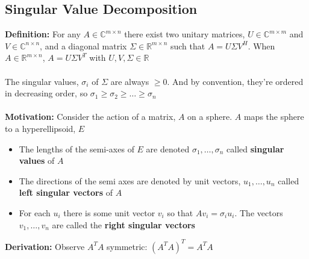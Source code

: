 \documentclass{article}
\begin{document}
\subsection{Singular Value Decomposition}
\textbf{Definition:} For any $A \in \mathbb{C}^{m\times n}$ there exist two unitary matrices, $U \in \mathbb{C}^{m \times m}$ and $V \in \mathbb{C}^{n \times n}$, and a diagonal matrix $\Sigma \in \mathbb{R}^{m \times n}$ such that $A = U\Sigma V^H$. When $A \in \mathbb{R}^{m \times n}$, $A = U\Sigma V^T$ with $U, V, \Sigma \in \mathbb{R}$ \\ \\
The singular values, $\sigma_i$ of $\Sigma$ are always $\geq0$. And by convention, they're ordered in decreasing order, so $\sigma_1 \geq \sigma_2 \geq \dots \geq \sigma_n$ \\ \\
\textbf{Motivation:} Consider the action of a matrix, $A$ on a sphere. $A$ maps the sphere to a hyperellipsoid, $E$
\begin{itemize}
    \item The lengths of the semi-axes of $E$ are denoted $\sigma_1, \dots, \sigma_n$ called \textbf{singular values} of $A$
    \item The directions of the semi axes are denoted by unit vectors, $u_1, \dots, u_n$ called \textbf{left singular vectors} of $A$
    \item For each $u_i$ there is some unit vector $v_i$ so that $Av_i = \sigma_iu_i$. The vectors $v_1, \dots, v_n$ are called the \textbf{right singular vectors}
\end{itemize}
\textbf{Derivation:} Observe $A^TA$ symmetric: $(A^TA)^T = A^TA$
\end{document}
